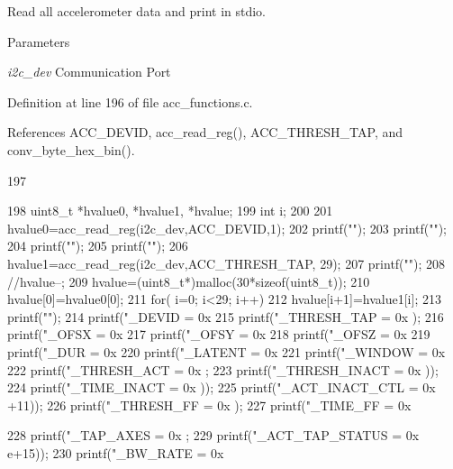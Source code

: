 Read all accelerometer data and print in stdio. 


\begin{DoxyParams}{Parameters}
\item[{\em i2c\_\-dev}]Communication Port \end{DoxyParams}


Definition at line 196 of file acc\_\-functions.c.



References ACC\_\-DEVID, acc\_\-read\_\-reg(), ACC\_\-THRESH\_\-TAP, and conv\_\-byte\_\-hex\_\-bin().




\begin{DoxyCode}
197 {
198   uint8_t *hvalue0, *hvalue1, *hvalue;
199   int i;
200   
201   hvalue0=acc_read_reg(i2c_dev,ACC_DEVID,1);
202   printf("\nhey");
203   printf("");
204   printf("");
205   printf("");
206   hvalue1=acc_read_reg(i2c_dev,ACC_THRESH_TAP, 29);
207   printf("");
208   //hvalue--;
209   hvalue=(uint8_t*)malloc(30*sizeof(uint8_t));
210   hvalue[0]=hvalue0[0];
211   for( i=0; i<29; i++)
212     hvalue[i+1]=hvalue1[i];
213   printf("");
214   printf("\nACC_DEVID = 0x%
215   printf("\nACC_THRESH_TAP = 0x%
      );
216   printf("\nACC_OFSX = 0x%
217   printf("\nACC_OFSY = 0x%
218   printf("\nACC_OFSZ = 0x%
219   printf("\nACC_DUR = 0x%
220   printf("\nACC_LATENT = 0x%
221   printf("\nACC_WINDOW = 0x%
222   printf("\nACC_THRESH_ACT = 0x%
      ;
223   printf("\nACC_THRESH_INACT = 0x%
      ));
224   printf("\nACC_TIME_INACT = 0x%
      ));
225   printf("\nACC_ACT_INACT_CTL = 0x%
      +11));
226   printf("\nACC_THRESH_FF = 0x%
      );
227   printf("\nACC_TIME_FF = 0x%
      
228   printf("\nACC_TAP_AXES = 0x%
      ;
229   printf("\nACC_ACT_TAP_STATUS = 0x%
      e+15));
230   printf("\nACC_BW_RATE = 0x%
      
}
\end{DoxyCode}
